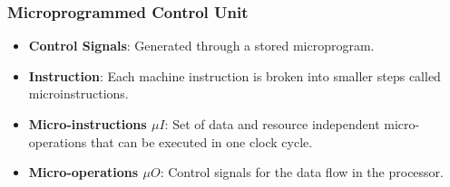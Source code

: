 \begin{frame}
    \frametitle{Microprogrammed Control Unit}
    \begin{itemize}
        \item \textbf{Control Signals}: Generated through a stored microprogram.
        \item \textbf{Instruction}: Each machine instruction is broken into smaller steps called microinstructions.
        \item \textbf{Micro-instructions $\mu I$}: Set of data and resource independent micro-operations that can be executed in one clock cycle.
        \item \textbf{Micro-operations $\mu O$}: Control signals for the data flow in the processor.
    \end{itemize}
\end{frame}

